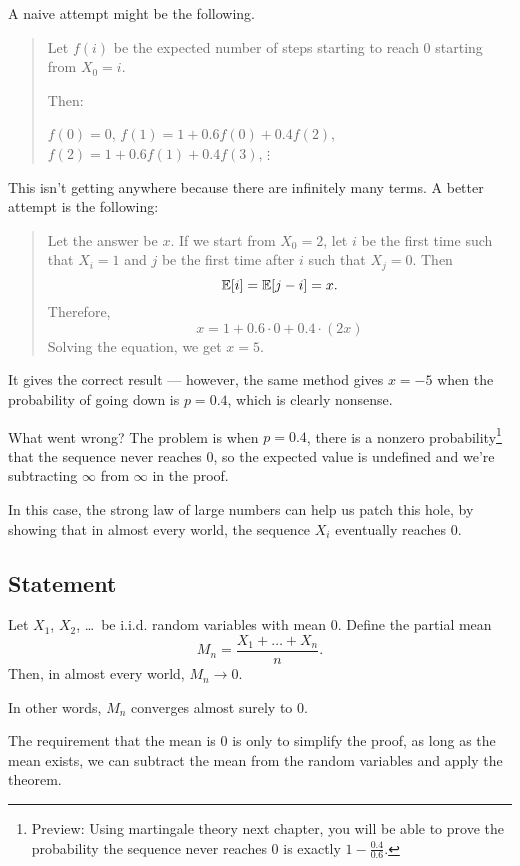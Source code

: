 A naive attempt might be the following.
\begin{quote}
	Let $f(i)$ be the expected number of steps starting to reach $0$ starting from $X_0=i$.

	Then:
	\begin{itemize}
		\ii $f(0)=0$,
		\ii $f(1)=1+0.6 f(0)+0.4 f(2)$,
		\ii $f(2)=1+0.6 f(1)+0.4 f(3)$,
		\ii $\vdots$
	\end{itemize}
\end{quote}
This isn't getting anywhere because there are infinitely many terms.
A better attempt is the following:
\begin{quote}
	Let the answer be $x$.
	If we start from $X_0=2$, let $i$ be the first time such that $X_i=1$
	and $j$ be the first time after $i$ such that $X_j=0$. Then
	\[ \mathbb E[i]=\mathbb E[j-i]=x. \]
	Therefore,
	\[ x = 1 + 0.6 \cdot 0 + 0.4 \cdot (2x) \]
	Solving the equation, we get $x=5$.
\end{quote}
It gives the correct result --- however, the same method gives $x=-5$ when
the probability of going down is $p=0.4$, which is clearly nonsense.

What went wrong? The problem is when $p=0.4$, there is a nonzero probability\footnote{%
	Preview: Using martingale theory next chapter, you will be able to prove the probability
	the sequence never reaches $0$ is exactly $1-\frac{0.4}{0.6}$.
} that the
sequence never reaches $0$, so the expected value is undefined
and we're subtracting $\infty$ from $\infty$ in the proof.

In this case, the strong law of large numbers can help us patch this hole, by showing that in almost
every world, the sequence $X_i$ eventually reaches $0$.

\subsection{Statement}

\begin{theorem}
Let $X_1$, $X_2$, \dots\ be i.i.d. random variables with mean $0$.
Define the partial mean
\[ M_n = \frac{X_1+\dots+X_n}{n}. \]
Then, in almost every world, $M_n \to 0$.
\end{theorem}
In other words, $M_n$ converges almost surely to $0$.

The requirement that the mean is $0$ is only to simplify the proof,
as long as the mean exists, we can subtract the mean from the random variables and apply the
theorem.

